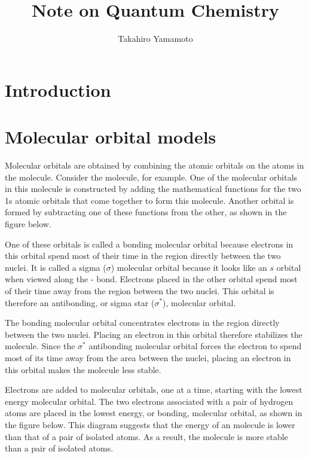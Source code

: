 \documentclass[11pt, oneside]{article}   	%
\title{Note on Quantum Chemistry}
\author{Takahiro Yamamoto}
\begin{document}
\maketitle
\section{Introduction}
\section{Molecular orbital models}
Molecular orbitals are obtained by combining the atomic orbitals on the atoms in the molecule. Consider the  molecule, for example. 
One of the molecular orbitals in this molecule is constructed by adding the mathematical functions for the two 1s atomic orbitals that come together to form this molecule. Another orbital is formed by subtracting one of these functions from the other, as shown in the figure below.

One of these orbitals is called a bonding molecular orbital because electrons in this orbital spend most of their time in the region directly between the two nuclei. 
It is called a sigma ($\sigma$) molecular orbital because it looks like an $s$ orbital when viewed along the - bond. 
Electrons placed in the other orbital spend most of their time away from the region between the two nuclei. This orbital is therefore an antibonding, or sigma star ($\sigma^*$), molecular orbital.

The bonding molecular orbital concentrates electrons in the region directly between the two nuclei. 
Placing an electron in this orbital therefore stabilizes the  molecule. 
Since the $\sigma^*$ antibonding molecular orbital forces the electron to spend most of its time away from the area between the nuclei, placing an electron in this orbital makes the molecule less stable.

Electrons are added to molecular orbitals, one at a time, starting with the lowest energy molecular orbital. 
The two electrons associated with a pair of hydrogen atoms are placed in the lowest energy, or  bonding, molecular orbital, as shown in the figure below. 
This diagram suggests that the energy of an  molecule is lower than that of a pair of isolated atoms. 
As a result, the  molecule is more stable than a pair of isolated atoms.
\end{document}
